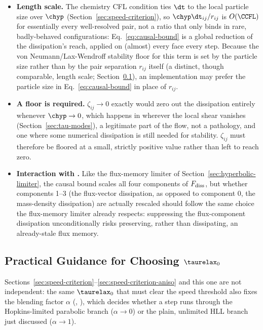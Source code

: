 \begin{itemize}
\item \textbf{Length scale.} The chemistry CFL condition ties $\dt$ to the
  local particle size over $\chyp$ (Section~\ref{sec:speed-criterion}), so
  $\chyp\dt_{ij}/r_{ij}$ is $O(\CCFL)$ for essentially every
  well-resolved pair, not a ratio that only binds in rare, badly-behaved
  configurations: Eq.~\eqref{eq:causal-bound} is a global reduction of the
  dissipation's reach, applied on (almost) every face every step. Because
  the von Neumann/Lax-Wendroff stability floor for this term is set by the
  particle size rather than by the pair separation $r_{ij}$ itself (a
  distinct, though comparable, length scale;
  Section~\ref{sec:practical-tau0}), an implementation may prefer the
  particle size in Eq.~\eqref{eq:causal-bound} in place of $r_{ij}$.
\item \textbf{A floor is required.} $\zeta_{ij}\to0$ exactly would zero
  out the dissipation entirely whenever $\chyp\to0$, which happens in
   wherever the local shear vanishes
  (Section~\ref{sec:tau-modes}), a legitimate part of the flow, not
  a pathology, and one where some numerical dissipation is still needed
  for stability. $\zeta_{ij}$ must therefore be floored at a small,
  strictly positive value rather than left to reach zero.
\item \textbf{Interaction with .} Like
  the flux-memory limiter of Section~\ref{sec:hyperbolic-limiter}, the
  causal bound scales all four components of $F_{\rm diss}$, but whether
  components 1--3 (the flux-vector dissipation, as opposed to component 0,
  the mass-density dissipation) are actually rescaled should follow the
  same  choice the flux-memory limiter
  already respects: suppressing the flux-component dissipation
  unconditionally risks preserving, rather than dissipating, an
  already-stale flux memory.
\end{itemize}

\subsection{Practical Guidance for Choosing $\taurelax_0$}
\label{sec:practical-tau0}

Sections~\ref{sec:speed-criterion}--\ref{sec:speed-criterion-aniso} and
this one are not independent: the same $\taurelax_0$ that must clear the
speed threshold also fixes the blending factor $\alpha$
(,
), which decides whether a
step runs through the Hopkins-limited parabolic branch ($\alpha\to0$) or
the plain, unlimited HLL branch just discussed ($\alpha\to1$).

